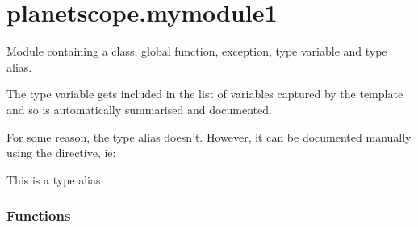 \documentclass[letterpaper,10pt,english]{sphinxmanual}
\begin{document}
\begin{fulllineitems}
\begin{quote}
\begin{description}
\end{description}\end{quote}

\end{fulllineitems}



\section{planetscope.mymodule1}
\label{\detokenize{_autosummary/planetscope.mymodule1:module-planetscope.mymodule1}}\label{\detokenize{_autosummary/planetscope.mymodule1:planetscope-mymodule1}}\label{\detokenize{_autosummary/planetscope.mymodule1::doc}}
\sphinxAtStartPar
Module containing a class, global function, exception, type variable and type alias.

\sphinxAtStartPar
The type variable gets included in the list of variables captured by the template and so is
automatically summarised and documented.

\sphinxAtStartPar
For some reason, the type alias doesn’t. However, it can be documented manually using
the  directive, ie:

\begin{sphinxVerbatim}[commandchars=\\\{\}]
  
\end{sphinxVerbatim}

\begin{fulllineitems}
\label{\detokenize{_autosummary/planetscope.mymodule1:planetscope.mymodule1.myTypeAlias}}
\sphinxAtStartPar
This is a type alias.

\end{fulllineitems}

\subsubsection*{Functions}
\end{document}
